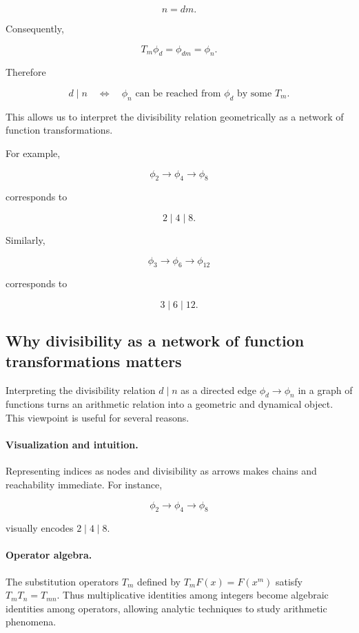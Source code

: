\[
n=dm.
\]

Consequently,

\[
T_m\phi_d
=
\phi_{dm}
=
\phi_n.
\]

Therefore

\[
\boxed{
d\mid n
\quad\Longleftrightarrow\quad
\phi_n
\text{ can be reached from }
\phi_d
\text{ by some }T_m.
}
\]

This allows us to interpret the divisibility relation geometrically as
a network of function transformations.

For example,

\[
\phi_2
\longrightarrow
\phi_4
\longrightarrow
\phi_8
\]

corresponds to

\[
2\mid4\mid8.
\]

Similarly,

\[
\phi_3
\longrightarrow
\phi_6
\longrightarrow
\phi_{12}
\]

corresponds to

\[
3\mid6\mid12.
\]

\subsection*{Why divisibility as a network of function transformations matters}

Interpreting the divisibility relation \(d\mid n\) as a directed edge
\(\phi_d\to\phi_n\) in a graph of functions turns an arithmetic relation
into a geometric and dynamical object. This viewpoint is useful for several reasons.

\paragraph{Visualization and intuition.}
Representing indices as nodes and divisibility as arrows makes chains and
reachability immediate. For instance,


\[
\phi_2\longrightarrow\phi_4\longrightarrow\phi_8
\]


visually encodes \(2\mid4\mid8\).

\paragraph{Operator algebra.}
The substitution operators \(T_m\) defined by \(T_mF(x)=F(x^m)\) satisfy
\(T_mT_n=T_{mn}\). Thus multiplicative identities among integers become
algebraic identities among operators, allowing analytic techniques to
study arithmetic phenomena.

